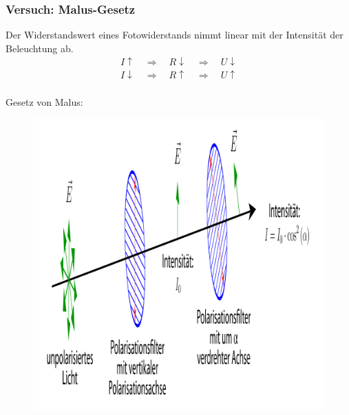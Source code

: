 \documentclass{beamer}
\begin{document}
\begin{frame}
    \frametitle{Versuch: Malus-Gesetz}
    Der Widerstandswert eines Fotowiderstands nimmt linear mit der Intensität der Beleuchtung ab.
    \begin{align*}
        I \uparrow \quad \Rightarrow \quad R \downarrow \quad \Rightarrow \quad U \downarrow \\
        I \downarrow \quad \Rightarrow \quad R \uparrow \quad \Rightarrow \quad U \uparrow \\
    \end{align*}
    
    Gesetz von Malus:
    \begin{figure}[htpb]
        \centering
        \includegraphics[width=1\textwidth]{malus}
    \end{figure}
\end{frame}
\end{document}
